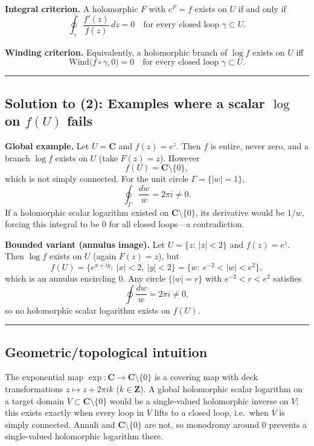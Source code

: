 \documentclass[11pt]{article}
\begin{document}
\noindent\textbf{Integral criterion.}
A holomorphic $F$ with $e^{F}=f$ exists on $U$ if and only if
\[
\oint_{\gamma}\frac{f'(z)}{f(z)}\,dz = 0
\quad\text{for every closed loop }\gamma\subset U.
\]

\medskip

\noindent\textbf{Winding criterion.}
Equivalently, a holomorphic branch of $\log f$ exists on $U$ iff
\[
\mathrm{Wind}\!\big(f\circ\gamma,0\big)=0
\quad\text{for every closed loop }\gamma\subset U.
\]

\bigskip\hrule\bigskip

\subsection*{Solution to (2): Examples where a scalar $\log$ on $f(U)$ fails}

\medskip

\noindent\textbf{Global example.}
Let $U=\mathbf{C}$ and $f(z)=e^{z}$. Then $f$ is entire, never zero, and a branch $\log f$ exists on $U$ (take $F(z)=z$). However
\[
f(U)=\mathbf{C}\setminus\{0\},
\]
which is not simply connected. For the unit circle $\Gamma=\{|w|=1\}$,
\[
\oint_{\Gamma}\frac{dw}{w} = 2\pi i \neq 0 .
\]
If a holomorphic scalar logarithm existed on $\mathbf{C}\setminus\{0\}$, its derivative would be $1/w$, forcing this integral to be $0$ for all closed loops—a contradiction.

\medskip

\noindent\textbf{Bounded variant (annulus image).}
Let $U=\{z:\ |z|<2\}$ and $f(z)=e^{z}$. Then $\log f$ exists on $U$ (again $F(z)=z$), but
\[
f(U)=\{e^{x+iy}:\ |x|<2,\ |y|<2\}
= \{w:\ e^{-2}<|w|<e^{2}\},
\]
which is an annulus encircling $0$. Any circle $\{|w|=r\}$ with $e^{-2}<r<e^{2}$ satisfies
\[
\oint \frac{dw}{w} = 2\pi i \neq 0 ,
\]
so no holomorphic scalar logarithm exists on $f(U)$.

\bigskip\hrule\bigskip

\subsection*{Geometric/topological intuition}

\medskip

\noindent The exponential map $\exp:\mathbf{C}\to\mathbf{C}\setminus\{0\}$ is a covering map with deck transformations $z\mapsto z+2\pi i k$ ($k\in\mathbf{Z}$). A global holomorphic scalar logarithm on a target domain $V\subset\mathbf{C}\setminus\{0\}$ would be a single-valued holomorphic inverse on $V$; this exists exactly when every loop in $V$ lifts to a closed loop, i.e.\ when $V$ is simply connected. Annuli and $\mathbf{C}\setminus\{0\}$ are not, so monodromy around $0$ prevents a single-valued holomorphic logarithm there.
\end{document}
